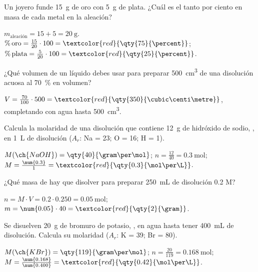 \begin{exercise}
    Un joyero funde \qty{15}{\gram} de oro con \qty{5}{\gram} de plata. ¿Cuál es el tanto por ciento en masa de cada metal en la aleación?
    \begin{solu}
        \(m_\text{aleación} = 15 + 5 = \qty{20}{\gram}\). \(\%\,\text{oro} = \frac{15}{20} \cdot 100 = \textcolor{red}{\qty{75}{\percent}}\); \(\%\,\text{plata} = \frac{5}{20} \cdot 100 = \textcolor{red}{\qty{25}{\percent}}\).
    \end{solu}
\end{exercise}

\begin{exercise}
    ¿Qué volumen de un líquido debes usar para preparar \qty{500}{\cubic\centi\metre} de una disolución acuosa al \qty{70}{\percent} en volumen?
    \begin{solu}
        \(V = \frac{70}{100} \cdot 500 = \textcolor{red}{\qty{350}{\cubic\centi\metre}}\), completando con agua hasta \qty{500}{\cubic\centi\metre}.
    \end{solu}
\end{exercise}

\begin{exercise}
    Calcula la molaridad de una disolución que contiene \qty{12}{\gram} de hidróxido de sodio, , en \qty{1}{\L} de disolución (\(A_r\): Na = 23; O = 16; H = 1).
    \begin{solu}
        \(M(\ch{NaOH}) = \qty{40}{\gram\per\mol}\); \(n = \frac{12}{40} = \qty{0.3}{\mol}\); \(M = \frac{\num{0.3}}{1} = \textcolor{red}{\qty{0.3}{\mol\per\L}}\).
    \end{solu}
\end{exercise}

\begin{exercise}
    ¿Qué masa de  hay que disolver para preparar \qty{250}{\mL} de disolución \num{0.2} M?
    \begin{solu}
        \(n = M \cdot V = \num{0.2} \cdot \num{0.250} = \qty{0.05}{\mol}\); \(m = \num{0.05} \cdot 40 = \textcolor{red}{\qty{2}{\gram}}\).
    \end{solu}
\end{exercise}

\begin{exercise}
    Se disuelven \qty{20}{\gram} de bromuro de potasio, , en agua hasta tener \qty{400}{\mL} de disolución. Calcula su molaridad (\(A_r\): K = 39; Br = 80).
    \begin{solu}
        \(M(\ch{KBr}) = \qty{119}{\gram\per\mol}\); \(n = \frac{20}{119} = \qty{0.168}{\mol}\); \(M = \frac{\num{0.168}}{\num{0.400}} = \textcolor{red}{\qty{0.42}{\mol\per\L}}\).
    \end{solu}
\end{exercise}

